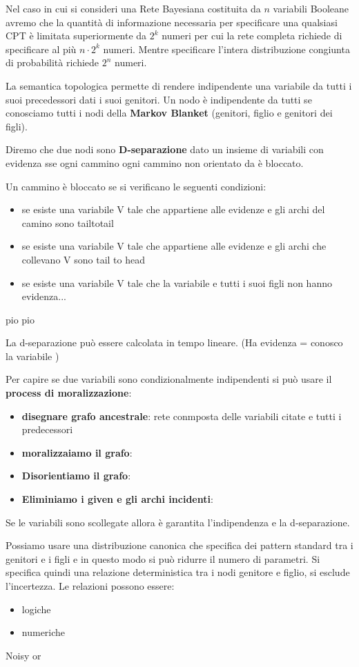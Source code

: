Nel caso in cui si consideri una Rete Bayesiana costituita da $n$ variabili
Booleane avremo che la quantità di informazione necessaria per specificare una
qualsiasi CPT è limitata superiormente da $2^k$ numeri per cui la rete completa
richiede di specificare al più $n \cdot 2^k$ numeri. Mentre specificare l'intera
distribuzione congiunta di probabilità richiede $2^n$ numeri.






La semantica topologica permette di rendere indipendente una variabile da tutti i 
suoi precedessori dati i suoi genitori. Un nodo è indipendente da tutti se conosciamo
tutti i nodi della \textbf{Markov Blanket} (genitori, figlio e genitori dei figli). 

Diremo che due nodi sono \textbf{D-separazione} dato un insieme di variabili con 
evidenza sse ogni cammino ogni cammino non orientato da è bloccato.

Un cammino è bloccato se si verificano le seguenti condizioni:
\begin{itemize}
    \item se esiste una variabile V tale che appartiene alle evidenze e gli archi
    del camino sono tailtotail
    \item se esiste una variabile V tale che appartiene alle evidenze e  gli archi 
    che collevano V sono tail to head
    \item se esiste una variabile V tale che la variabile e tutti i suoi figli
    non hanno evidenza...
\end{itemize}
\begin{teorema}
    pio pio
\end{teorema}

La d-separazione può essere calcolata in tempo lineare. (Ha evidenza = conosco la variabile )

Per capire se due variabili sono condizionalmente indipendenti si può usare il 
\textbf{process di moralizzazione}:
\begin{itemize}
    \item \textbf{disegnare grafo ancestrale}: rete conmposta delle variabili citate e tutti i 
    predecessori
    \item \textbf{moralizzaiamo il grafo}: 
    \item \textbf{Disorientiamo il grafo}: 
    \item \textbf{Eliminiamo i given e gli archi incidenti}: 
\end{itemize}
Se le variabili sono scollegate allora è garantita l'indipendenza e la d-separazione.

Possiamo usare una distribuzione canonica che specifica dei pattern standard tra 
i genitori e i figli e in questo modo si può ridurre il numero di parametri. Si 
specifica quindi una relazione deterministica tra i nodi genitore e figlio, si esclude 
l'incertezza. Le relazioni possono essere:
\begin{itemize}
    \item logiche
    \item numeriche
\end{itemize}

Noisy or 